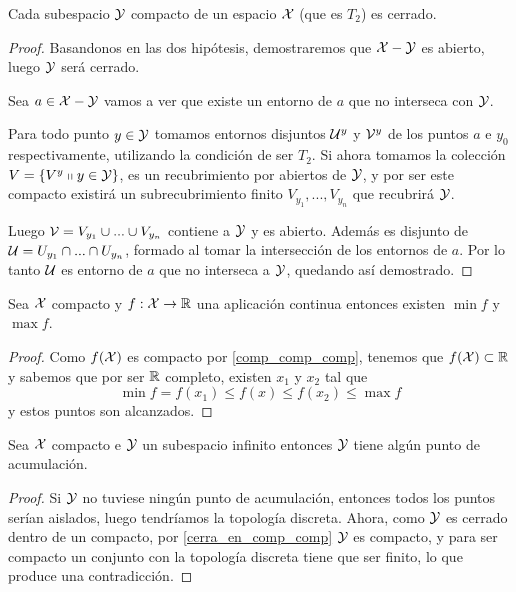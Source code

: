 \begin{prop}
	Cada subespacio $\mathcal{Y}$ compacto de un espacio $\mathcal{X}$ (que es $T_2$) es cerrado.
	\begin{proof}
		Basandonos en las dos hipótesis, demostraremos que $\mathcal{X} - \mathcal{Y}$ es abierto, luego $\mathcal{Y}$ será cerrado.
		
		Sea $a \in \mathcal{X}-\mathcal{Y}$ vamos a ver que existe un entorno de $a$ que no interseca con $\mathcal{Y}$.
		
		Para todo punto $y \in \mathcal{Y}$ tomamos entornos disjuntos $\mathcal{U}^y$ y $\mathcal{V}^y$ de los puntos $a$ e $y_0$ respectivamente, utilizando la condición de ser $T_2$. Si ahora tomamos la colección $V = \{V^y \shortparallel y \in \mathcal{Y}\}$, es un recubrimiento por abiertos de $\mathcal{Y}$, y por ser este compacto existirá un subrecubrimiento finito $V_{y_1}, ..., V_{y_n}$ que recubrirá $\mathcal{Y}$.
		
		Luego $\mathcal{V} = V_{y_1} \cup ... \cup V_{y_n}$ contiene a $\mathcal{Y}$ y es abierto. Además es disjunto de $\mathcal{U} = U_{y_1} \cap ... \cap U_{y_n}$, formado al tomar la intersección de los entornos de $a$. Por lo tanto $\mathcal{U}$ es entorno de $a$ que no interseca a $\mathcal{Y}$, quedando así demostrado.
	\end{proof}
\end{prop}


\begin{prop}
	Sea $\mathcal{X}$ compacto y $f:\mathcal{X} \rightarrow \mathbb{R}$ una aplicación continua entonces existen $\min f$ y $\max f$.
	\begin{proof}
		Como $f(\mathcal{X})$ es compacto por \ref{comp_comp_comp}, tenemos que $f(\mathcal{X}) \subset \mathbb{R}$ y sabemos que por ser $\mathbb{R}$ completo, existen $x_1$ y $x_2$ tal que
		\begin{equation}
			\min f = f(x_1) \leq f(x) \leq f(x_2) \leq \max f
		\end{equation}
		y estos puntos son alcanzados.
	\end{proof}
\end{prop}


\begin{prop}
		Sea $\mathcal{X}$ compacto e $\mathcal{Y}$ un subespacio infinito entonces $\mathcal{Y}$ tiene algún punto de acumulación.
	\begin{proof}
		Si $\mathcal{Y}$ no tuviese ningún punto de acumulación, entonces todos los puntos serían aislados, luego tendríamos la topología discreta. Ahora, como $\mathcal{Y}$ es cerrado dentro de un compacto, por \ref{cerra_en_comp_comp} $\mathcal{Y}$ es compacto, y para ser compacto un conjunto con la topología discreta tiene que ser finito, lo que produce una contradicción.
	\end{proof}
\end{prop}

